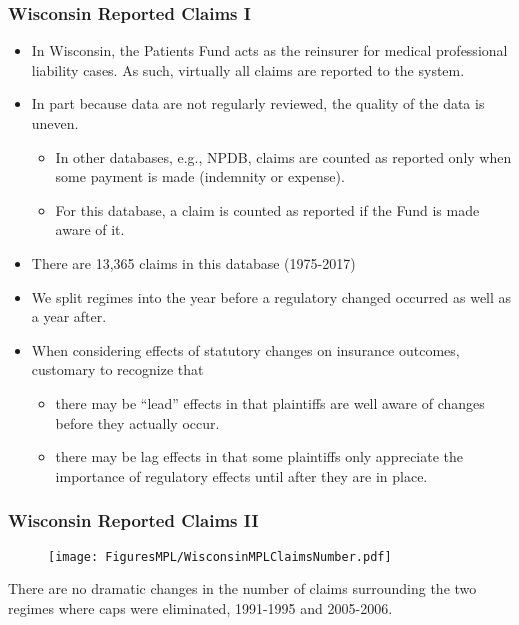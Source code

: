 \documentclass[serif,10pt]{beamer}
\begin{document}
\begin{frame}
\frametitle{Wisconsin Reported Claims I}
  \begin{itemize}
\item In Wisconsin, the Patients Fund acts as the reinsurer for medical professional liability cases. As such, virtually all claims are reported to the system.
\item In part because data are not regularly reviewed, the quality of the data is uneven.
 \begin{itemize}
 \item In other databases, e.g., NPDB, claims are counted as reported only when some payment is made (indemnity or expense).
\item For this database, a claim is counted as reported if the Fund is made aware of it.
\end{itemize} \pause
\item There are 13,365 claims in this database (1975-2017)
\item We split regimes into the year before a regulatory changed occurred as well as a year after.
\item When considering effects of statutory changes on insurance outcomes, customary to recognize that
\begin{itemize}
\item there may be ``lead'' effects in that plaintiffs are well aware of changes before they actually occur.
\item there may be lag effects in that some plaintiffs only appreciate the importance of regulatory effects until after they are in place.
\end{itemize}

\end{itemize}
\end{frame}

\begin{frame}
\frametitle{Wisconsin Reported Claims II}
\vspace{-.2in}
\begin{figure}[htp]
    \texttt{[image: FiguresMPL/WisconsinMPLClaimsNumber.pdf]}
\end{figure}
\vspace{-.3in}
There are no dramatic changes in the number of claims surrounding the two regimes where caps were eliminated, 1991-1995 and 2005-2006.
\end{frame}
\end{document}
